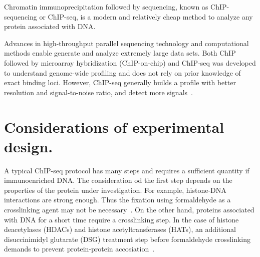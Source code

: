 
















Chromatin immunoprecipitation followed by sequencing, known as ChIP-sequencing or ChIP-seq, is a modern and relatively cheap method to analyze any protein associated with DNA. 

Advances in high-throughput parallel sequencing technology and computational methods enable generate and analyze extremely large data sets. 
Both ChIP followed by microarray hybridization (ChIP-on-chip) and ChIP-seq was developed to understand genome-wide profiling and does not rely on prior knowledge of exact binding loci.
However, ChIP-seq generally builds a profile with better resolution and signal-to-noise ratio, and detect more signals~\cite{park2009chip}.














\section{Considerations of experimental design.}

A typical ChIP-seq protocol has many steps and requires a sufficient quantity if immunoenriched DNA. 
The consideration od the first step depends on the properties of the protein under investigation. 
For example, histone-DNA interactions are strong enough. 
Thus the fixation using formaldehyde as a crosslinking agent may not be necessary~\cite{barski2008identification}. 
On the other hand, proteins associated with DNA for a short time require a crosslinking step. 
In the case of histone deacetylases (HDACs) and histone acetyltransferases (HATs), an additional disuccinimidyl glutarate (DSG) treatment step before formaldehyde crosslinking demands to prevent protein-protein accosiation~\cite{wang2009genome}. 

